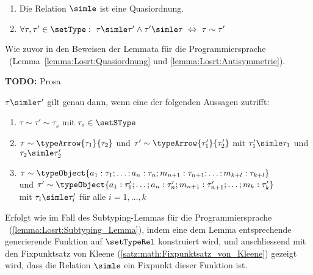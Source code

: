 \begin{lemma} \label{lemma:Lct:Quasiordnung_und_Antisymmetrie} \
  \begin{enumerate}
    \item Die Relation $\simle$ ist eine Quasiordnung.
    \item $\forall \tau,\tau'\in\setType:\ \tau \simle \tau' \wedge \tau' \simle \tau\ \Leftrightarrow\ \tau\sim\tau'$
  \end{enumerate}
\end{lemma}

\begin{beweis}
  Wie zuvor in den Beweisen der Lemmata f\"ur die Programmiersprache \Losrt\ (Lemma~\ref{lemma:Losrt:Quasiordnung} und
  \ref{lemma:Losrt:Antisymmetrie}).
\end{beweis}

{\bf TODO:} Prosa

\begin{lemma}[Subtyping-Lemma f\"ur \Lct] \label{lemma:Lct:Subtyping_Lemma}
  $\tau \simle \tau'$ gilt genau dann, wenn eine der folgenden Aussagen zutrifft:
  \begin{enumerate}
    \item $\tau \sim \tau' \sim \tau_s$ mit $\tau_s \in \setSType$

    \item $\tau \sim \typeArrow{\tau_1}{\tau_2}$ und $\tau' \sim \typeArrow{\tau_1'}{\tau_2'}$ mit
          $\tau_1' \simle \tau_1$ und $\tau_2 \simle \tau_2'$

    \item $\tau \sim \typeObject{a_1:\tau_1;\ldots;a_n:\tau_n;m_{n+1}:\tau_{n+1};\ldots;m_{k+l}:\tau_{k+l}}$ \\
          und $\tau' \sim \typeObject{a_1:\tau_1';\ldots;a_n:\tau_n';m_{n+1}:\tau_{n+1}';\ldots;m_k:\tau_k'}$ \\
          mit $\tau_i \simle \tau_i'$ f\"ur alle $i=1,\ldots,k$
  \end{enumerate}
\end{lemma}

\begin{beweis}
  Erfolgt wie im Fall des Subtyping-Lemmas f\"ur die Programmiersprache \Losrt\ (\ref{lemma:Losrt:Subtyping_Lemma}),
  indem eine dem Lemma entsprechende generierende Funktion auf $\setTypeRel$ konstruiert wird, und anschliessend
  mit den Fixpunktsatz von Kleene (\ref{satz:math:Fixpunktsatz_von_Kleene}) gezeigt wird, dass die Relation
  $\simle$ ein Fixpunkt dieser Funktion ist.
\end{beweis}

